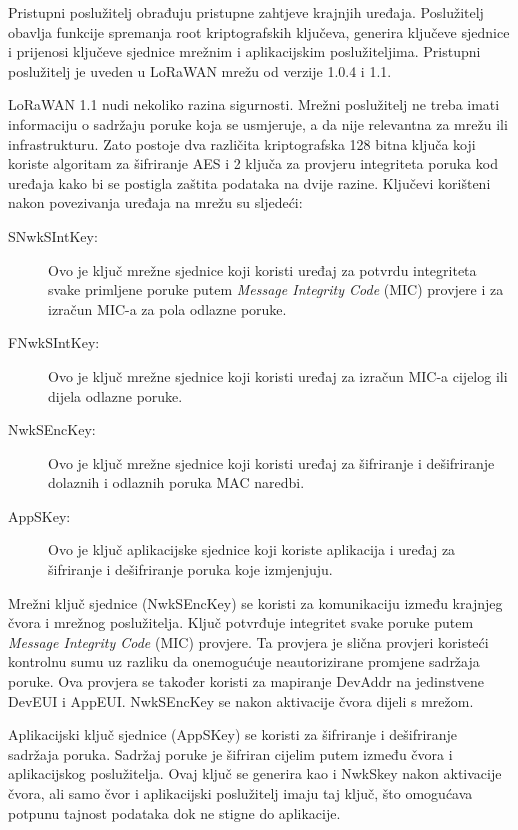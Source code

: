 \documentclass[times, utf8, diplomski]{fer}
\begin{document}
Pristupni poslužitelj obrađuju pristupne zahtjeve krajnjih uređaja. Poslužitelj obavlja funkcije spremanja root kriptografskih ključeva, generira ključeve sjednice i prijenosi ključeve sjednice mrežnim i aplikacijskim poslužiteljima. Pristupni poslužitelj je uveden u LoRaWAN mrežu od verzije 1.0.4 i 1.1.

LoRaWAN 1.1 nudi nekoliko razina sigurnosti. Mrežni poslužitelj ne treba imati informaciju o sadržaju poruke koja se usmjeruje, a da nije relevantna za mrežu ili infrastrukturu. Zato postoje dva različita kriptografska 128 bitna ključa koji koriste algoritam za šifriranje AES i 2 ključa za provjeru integriteta poruka kod uređaja kako bi se postigla zaštita podataka na dvije razine. Ključevi korišteni nakon povezivanja uređaja na mrežu su sljedeći:
\begin{description}
    \item[SNwkSIntKey:]Ovo je ključ mrežne sjednice koji koristi uređaj za potvrdu integriteta svake primljene poruke putem \emph{Message Integrity Code} (MIC) provjere i za izračun MIC-a za pola odlazne poruke.
    \item[FNwkSIntKey:]Ovo je ključ mrežne sjednice koji koristi uređaj za izračun MIC-a cijelog ili dijela odlazne poruke.
    \item[NwkSEncKey:]Ovo je ključ mrežne sjednice koji koristi uređaj za šifriranje i dešifriranje dolaznih i odlaznih poruka MAC naredbi.
    \item[AppSKey:]Ovo je ključ aplikacijske sjednice koji koriste aplikacija i uređaj za šifriranje i dešifriranje poruka koje izmjenjuju.
\end{description}
Mrežni ključ sjednice (NwkSEncKey) se koristi za komunikaciju između krajnjeg čvora i mrežnog poslužitelja. Ključ potvrđuje integritet svake poruke putem \emph{Message Integrity Code} (MIC) provjere. Ta provjera je slična provjeri koristeći kontrolnu sumu uz razliku da onemogućuje neautorizirane promjene sadržaja poruke. Ova provjera se također koristi za mapiranje DevAddr na jedinstvene DevEUI i AppEUI. NwkSEncKey se nakon aktivacije čvora dijeli s mrežom.

Aplikacijski ključ sjednice (AppSKey) se koristi za šifriranje i dešifriranje sadržaja poruka. Sadržaj poruke je šifriran cijelim putem između čvora i aplikacijskog poslužitelja. Ovaj ključ se generira kao i NwkSkey nakon aktivacije čvora, ali samo čvor i aplikacijski poslužitelj imaju taj ključ, što omogućava potpunu tajnost podataka dok ne stigne do aplikacije.
\end{document}
